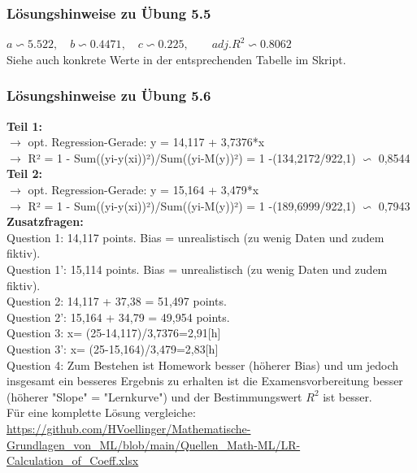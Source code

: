 \documentclass[12pt]{article}
\begin{document}
\subsubsection{Lösungshinweise zu Übung 5.5}
%
$ a \backsim 5.522, \quad b \backsim 0.4471, \quad c \backsim 0.225, \qquad adj.R^2 \backsim 0.8062 $\\[0.2cm]
Siehe auch konkrete Werte in der entsprechenden Tabelle im Skript.
%
\subsubsection{Lösungshinweise zu Übung 5.6}
%
\textbf{Teil 1:}\\
$\rightarrow$ opt. Regression-Gerade:  y =  14,117 + 3,7376*x \\[0.3cm]
$\rightarrow$ R² = 1 - Sum((yi-y(xi))²)/Sum((yi-M(y))²) = 1 -(134,2172/922,1) $\backsim $ 0,8544 \\[0.3cm]	
%				
\textbf{Teil 2:}\\
$\rightarrow$ opt. Regression-Gerade:  y =  15,164 + 3,479*x \\[0.3cm]
$\rightarrow$ R² = 1 - Sum((yi-y(xi))²)/Sum((yi-M(y))²) = 1 -(189,6999/922,1) $\backsim $ 0,7943 \\[0.3cm]	
%				
							
\textbf{Zusatzfragen:}\\
%
Question 1:   14,117 points. Bias = unrealistisch (zu wenig Daten und zudem fiktiv).	\\[0.1cm]
Question 1': 15,114 points. Bias = unrealistisch (zu wenig Daten und zudem fiktiv).	\\[0.1cm]		
Question 2:  14,117 + 37,38 = 51,497 points.\\[0.1cm]
Question 2': 15,164 + 34,79 = 49,954 points.\\[0.1cm]		
Question 3:  x= (25-14,117)/3,7376=2,91[h] \\[0.3cm]	
Question 3': x= (25-15,164)/3,479=2,83[h] \\[0.3cm]	
Question 4: Zum Bestehen ist Homework besser (höherer Bias) und um jedoch insgesamt ein besseres Ergebnis zu erhalten ist die Examensvorbereitung besser (höherer "Slope" = "Lernkurve") und der Bestimmungswert $R^2$ ist besser.\\[0.3cm]	
%
\hspace*{0.0cm}Für eine komplette Lösung vergleiche:\\
\url{https://github.com/HVoellinger/Mathematische-Grundlagen_von_ML/blob/main/Quellen_Math-ML/LR-Calculation_of_Coeff.xlsx}
\end{document}
